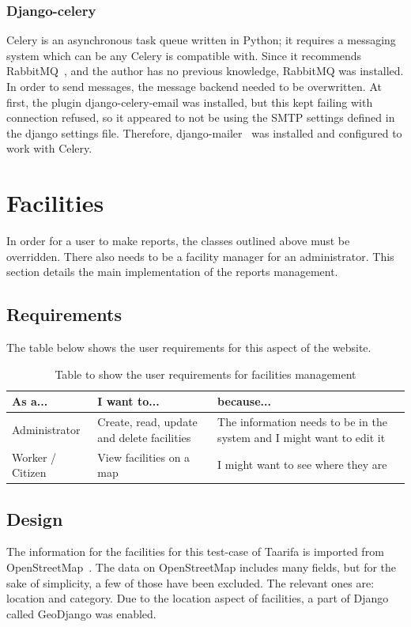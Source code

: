 \subsection{Django-celery~\cite{celery}}
Celery is an asynchronous task queue written in Python; it requires a messaging system which can be any Celery is compatible with. Since it recommends RabbitMQ~\cite{rabbitmq}, and the author has no previous knowledge, RabbitMQ was installed. \\
In order to send messages, the message backend needed to be overwritten. At first, the plugin django-celery-email was installed, but this kept failing with connection refused, so it appeared to not be using the SMTP settings defined in the django settings file. Therefore, django-mailer~\cite{mailer} was installed and configured to work with Celery. \\

\chapter{Facilities}
\label{chap:facilities}
In order for a user to make reports, the classes outlined above must be overridden. There also needs to be a facility manager for an administrator. This section details the main implementation of the reports management.

\section{Requirements}
The table below shows the user requirements for this aspect of the website.

\begin{table}[h]
\centering
\begin{tabular}{p{2cm}p{4.2cm}p{4.2cm}}
\textbf{As a...} & \textbf{I want to...} & \textbf{because...} \\
\hline
Administrator & Create, read, update and delete facilities & The information needs to be in the system and I might want to edit it \\
Worker / Citizen & View facilities on a map & I might want to see where they are \\
\end{tabular}
\caption{Table to show the user requirements for facilities management}
\label{tab:facuser}
\end{table}

\section{Design}
The information for the facilities for this test-case of Taarifa is imported from OpenStreetMap~\cite{openstreetmap}. The data on OpenStreetMap includes many fields, but for the sake of simplicity, a few of those have been excluded. The relevant ones are: location and category. Due to the location aspect of facilities, a part of Django called GeoDjango was enabled.

